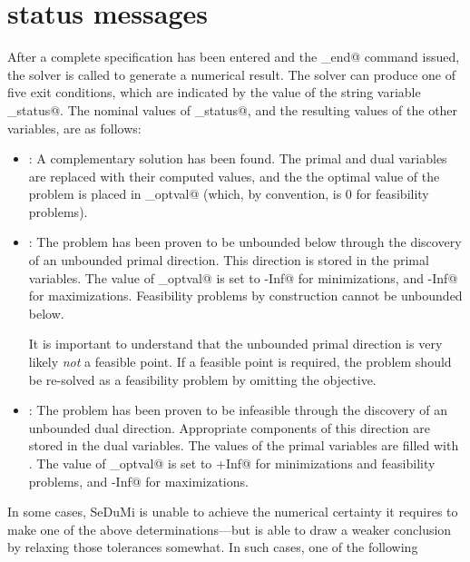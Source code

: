\documentclass[12pt]{article}
\begin{document}
\section{\cvx status messages}
\label{sec:status}

After a complete \cvx specification has been entered and the \verb@cvx_end@ command 
issued, the solver is called to generate a numerical result. The solver can produce
one of five exit conditions, which are indicated by the value of the string variable
\verb@cvx_status@. The nominal values of \verb@cvx_status@, and the resulting 
values of the other variables, are as follows:
\begin{itemize}
	\item \verb@Solved@: A complementary solution has been found.
	      The primal and dual variables are replaced with their computed values, and the
	      the optimal value of the problem is placed in \verb@cvx_optval@ (which, by
	      convention, is $0$ for feasibility problems).
	\item \verb@Unbounded@: The problem has been proven to be unbounded below
	      through the discovery of an unbounded primal direction. This direction
	      is stored in the primal variables. The value of \verb@cvx_optval@
	      is set to \verb@-Inf@ for minimizations, and
	      \verb@-Inf@ for maximizations. Feasibility problems by construction
	      cannot be unbounded below.
	      
	      It is important to understand that the unbounded primal direction is very
	      likely \emph{not} a feasible point. If a feasible point is required, the 
	      problem should be re-solved as a feasibility problem by omitting the objective.
	\item \verb@Infeasible@: The problem has been proven to be infeasible
	      through the discovery of an unbounded dual direction. Appropriate
	      components of this direction are stored in the dual variables. The values of the
	      primal variables are filled with \verb@NaN@s. The value of \verb@cvx_optval@
	      is set to \verb@+Inf@ for minimizations and feasibility problems,
	      and \verb@-Inf@ for maximizations.
\end{itemize}
In some cases, SeDuMi is unable to achieve the numerical certainty it requires to
make one of the above determinations---but is able to draw a weaker conclusion
by relaxing those tolerances somewhat. In such cases, one of the following
\end{document}
